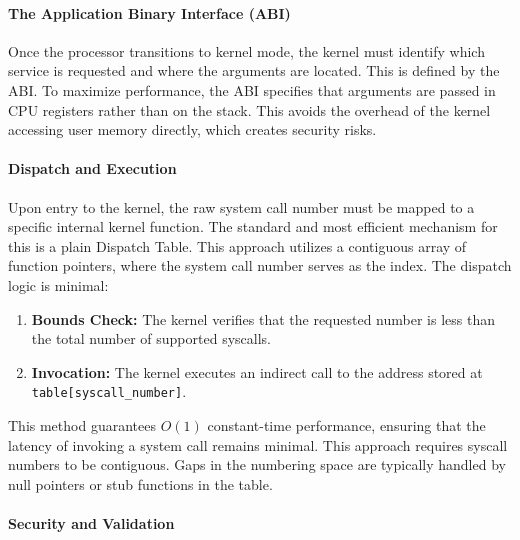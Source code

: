 \documentclass[a4paper,10pt,twoside]{report}
\theoremstyle{definition}
\begin{document}
\paragraph{The Application Binary Interface (ABI)}

Once the processor transitions to kernel mode, the kernel must identify which service is requested and where the arguments are located. This is defined by the ABI. To maximize performance, the ABI specifies that arguments are passed in CPU registers rather than on the stack. This avoids the overhead of the kernel accessing user memory directly, which creates security risks.

\paragraph{Dispatch and Execution}

Upon entry to the kernel, the raw system call number must be mapped to a specific internal kernel function. The standard and most efficient mechanism for this is a plain Dispatch Table. This approach utilizes a contiguous array of function pointers, where the system call number serves as the index. The dispatch logic is minimal:
\begin{enumerate}
    \item \textbf{Bounds Check:} The kernel verifies that the requested number is less than the total number of supported syscalls.
    \item \textbf{Invocation:} The kernel executes an indirect call to the address stored at \texttt{table[syscall\_number]}.
\end{enumerate}
This method guarantees $O(1)$ constant-time performance, ensuring that the latency of invoking a system call remains minimal. This approach requires syscall numbers to be contiguous. Gaps in the numbering space are typically handled by null pointers or stub functions in the table.

\paragraph{Security and Validation}
\end{document}

